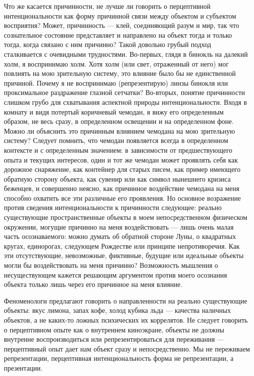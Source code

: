 \documentclass[11pt]{book}
\begin{document}
Что же касается причинности, не лучше ли говорить о перцептивной интенциональности как форму причинной связи между объектом и субъектом восприятия? Может, причинность --- клей, соединяющий разум и мир, так что сознательное состояние представляет и направлено на объект тогда и только тогда, когда связано с ним причинно? Такой довольно грубый подход сталкивается с очевидными трудностями. Во-первых, глядя в бинокль на далекий холм, я воспринимаю холм. Хотя холм (или свет, отраженный от него) мог повлиять на мою зрительную систему, это влияние было бы не единственной причиной. Почему я не воспринимаю (репрезентирую) линзы бинокля или проксимальное раздражение глазной сетчатки? Во-вторых, понятие причинности слишком грубо для схватывания аспектной природы интенциональности. Входя в комнату и видя потертый коричневый чемодан, я вижу его определенным образом, не весь сразу, в определенном освещении и на определенном фоне. Можно ли объяснить это причинным влиянием чемодана на мою зрительную систему? Следует помнить, что чемодан появляется всегда в определенном контексте и с определенным значением: в зависимости от предшествующего опыта и текущих интересов, один и тот же чемодан может проявлять себя как дорожное снаряжение, как контейнер для старых писем, как пример имеющего обратную сторону объекта, как сувенир или как символ нынешнего кризиса беженцев, и совершенно неясно, как причинное воздействие чемодана на меня способно охватить все эти различные его проявления. Но основное возражение против сведения интенциональности к причинности следующее: реально существующие пространственные объекты в моем непосредственном физическом окружении, могущие причинно на меня воздействовать --- лишь очень малая часть осознаваемого: можно думать об обратной стороне Луны, о квадратных кругах, единорогах, следующем Рождестве или принципе непротиворечия. Как эти отсутствующие, невозможные, фиктивные, будущие или идеальные объекты могли бы воздействовать на меня причинно? Возможность мышления о несуществующем кажется решающим аргументом против моего осознания объекта только лишь через его причинное на меня влияние.

Феноменологи предлагают говорить о направленности на реально существующие объекты: вкус лимона, запах кофе, холод кубика льда --- качества наличных объектов, а не каких-то ложных психических их коррелятов. Не следует говорить о перцептивном опыте как о внутреннем киноэкране, объекты не должны внутренне воспроизводиться или репрезентироваться для переживания --- перцептивный опыт дает нам объект сразу и непосредственно. Мы не переживаем репрезентации, перцептивная интенциональность форма не репрезентации, а презентации.
\end{document}
